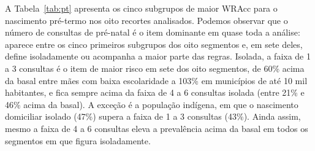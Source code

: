 A Tabela~\ref{tab:pt} apresenta os cinco subgrupos de maior WRAcc para o nascimento pré-termo nos oito recortes analisados.
Podemos observar que o número de consultas de pré-natal é o item dominante em quase toda a análise: aparece entre os cinco primeiros subgrupos dos oito segmentos e, em sete deles, define isoladamente ou acompanha a maior parte das regras. Isolada, a faixa de 1 a 3 consultas é o item de maior risco em sete dos oito segmentos, de 60\% acima da basal entre mães com baixa escolaridade a 103\% em municípios de até 10 mil habitantes, e fica sempre acima da faixa de 4 a 6 consultas isolada (entre 21\% e 46\% acima da basal). A exceção é a população indígena, em que o nascimento domiciliar isolado (47\%) supera a faixa de 1 a 3 consultas (43\%). Ainda assim, mesmo a faixa de 4 a 6 consultas eleva a prevalência acima da basal em todos os segmentos em que figura isoladamente.


